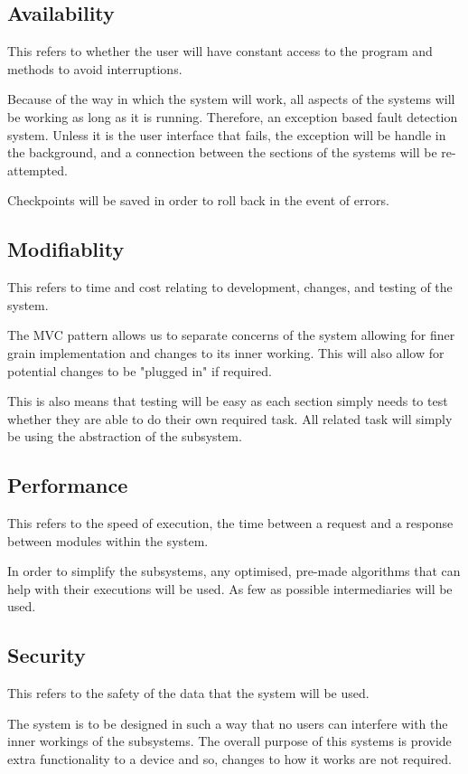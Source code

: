 \subsection{Availability}
This refers to whether the user will have constant access to the program and methods to avoid interruptions.

Because of the way in which the system will work, all aspects of the systems will be working as long as it is running. Therefore, an exception based fault detection system. Unless it is the user interface that fails, the exception will be handle in the background, and a connection between the sections of the systems will be re-attempted.

Checkpoints will be saved in order to roll back in the event of errors.

\subsection{Modifiablity}
This refers to time and cost relating to development, changes, and testing of the system.

The MVC pattern allows us to separate concerns of the system allowing for finer grain implementation and changes to its inner working. This will also allow for potential changes to be "plugged in" if required.

This is also means that testing will be easy as each section simply needs to test whether they are able to do their own required task. All related task will simply be using the abstraction of the subsystem.

\subsection{Performance}
This refers to the speed of execution, the time between a request and a response between modules within the system.

In order to simplify the subsystems, any optimised, pre-made algorithms that can help with their executions will be used. As few as possible intermediaries will be used.

\subsection{Security}
This refers to the safety of the data that the system will be used.

The system is to be designed in such a way that no users can interfere with the inner workings of the subsystems. The overall purpose of this systems is provide extra functionality to a device and so, changes to how it works are not required.

